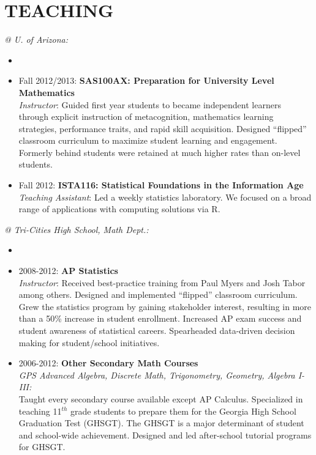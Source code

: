 \documentclass[paper=a4,fontsize=11pt]{scrartcl} %
\newcommand{\NewPart}[2]{\section*{\uppercase{#1} #2 }}
\newcommand{\CourseEntry}[3]{
		\noindent \item{#1: \textbf{#2} \\ #3}}
\begin{document}
\NewPart{Teaching}{}
\vspace{-7pt}
\textit{@ U. of Arizona:}
\begin{itemize}[noitemsep]
\item[]
\vspace{-15pt}

\CourseEntry{Fall 2012/2013}{SAS100AX: Preparation for University Level Mathematics}{\textit{Instructor}: Guided first year students to became independent learners through explicit instruction of metacognition, mathematics learning strategies, performance traits, and rapid skill acquisition. Designed ``flipped'' classroom curriculum to maximize student learning and engagement. Formerly behind students were retained at much higher rates than on-level students.}
\CourseEntry{Fall 2012}{ISTA116: Statistical Foundations in the Information Age}{\textit{Teaching Assistant}: Led a weekly statistics laboratory. We focused on a broad range of applications with computing solutions via \textsc{R}.}

\end{itemize}

\noindent\textit{@ Tri-Cities High School, Math Dept.:}

\begin{itemize}
\item[]
\vspace{-24pt}

\CourseEntry{2008-2012}{AP Statistics}{\textit{Instructor}: Received best-practice training from Paul Myers and Josh Tabor among others. Designed and implemented ``flipped'' classroom curriculum. Grew the statistics program by gaining stakeholder interest, resulting in more than a 50\% increase in student enrollment. Increased AP exam success and student awareness of statistical careers. Spearheaded data-driven decision making for student/school initiatives.}
\CourseEntry{2006-2012}{Other Secondary Math Courses}{\textit{GPS Advanced Algebra, Discrete Math, Trigonometry, Geometry, Algebra I-III:} \\Taught every secondary course available except AP Calculus. Specialized in teaching 11$^{th}$ grade students to prepare them for the Georgia High School Graduation Test (GHSGT). The GHSGT is a major determinant of student and school-wide achievement. Designed and led after-school tutorial programs for GHSGT.}

\end{itemize}
\end{document}
